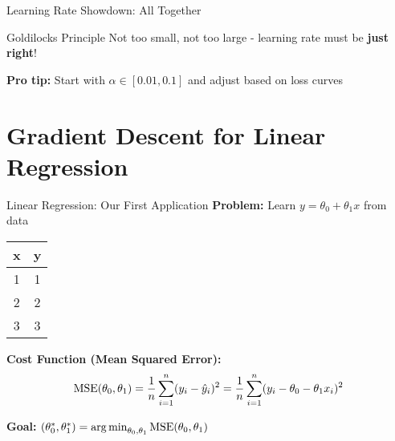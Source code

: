 \documentclass[usenames,dvipsnames]{beamer}
\begin{document}
\begin{frame}{Learning Rate Showdown: All Together}
\begin{center}
    \end{center}
    
    \vspace{0.5cm}
    \begin{theorembox}{Goldilocks Principle}
    {\small Not too small, not too large - learning rate must be \textbf{just right}!}
    \end{theorembox}
    
    \begin{keypointsbox}{}
    {\small \textbf{Pro tip:} Start with $\alpha \in [0.01, 0.1]$ and adjust based on loss curves}
    \end{keypointsbox}
  \end{frame}

  \section{Gradient Descent for Linear Regression}

  \begin{frame}{Linear Regression: Our First Application}
    \textbf{Problem:} Learn $y = \theta_0 + \theta_1 x$ from data
    
    \begin{center}
    \begin{tabular}{|c|c|}
        \hline
        \textbf{x} & \textbf{y} \\
        \hline
        1 & 1 \\
        2 & 2 \\
        3 & 3 \\
        \hline
    \end{tabular}
    \end{center}
    
    \pause
    \textbf{Cost Function (Mean Squared Error):}
    $$\operatorname{MSE}(\theta_0, \theta_1) = \frac{1}{n}\sum_{i=1}^n (y_i - \hat{y}_i)^2 = \frac{1}{n}\sum_{i=1}^n (y_i - \theta_0 - \theta_1 x_i)^2$$
    
    \pause
    \textbf{Goal:} $(\theta_0^*, \theta_1^*) = \operatorname*{arg\,min}_{\theta_0, \theta_1} \operatorname{MSE}(\theta_0, \theta_1)$
  \end{frame}
\end{document}
